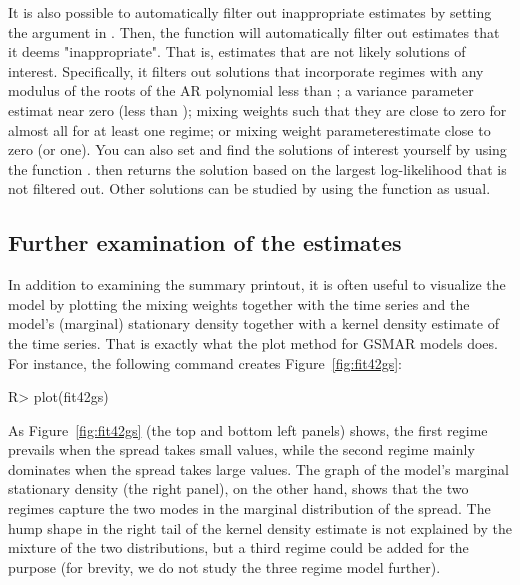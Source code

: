 \documentclass[nojss]{jss} %
\begin{document}
It is also possible to automatically filter out inappropriate estimates by setting the argument  in . Then, the function will automatically filter out estimates that it deems "inappropriate".  That is, estimates that are not likely solutions of interest. Specifically, it filters out solutions that incorporate regimes with any modulus of the roots of the AR polynomial less than ; a variance parameter estimat near zero  (less than ); mixing weights such that they are close to zero for almost all  for at least one regime; or mixing weight parameterestimate close to zero (or one). You can also set  and find the solutions of interest yourself by using the function .  then returns the solution based on the largest log-likelihood that is not filtered out. Other solutions can be studied by using the function  as usual.


\subsection{Further examination of the estimates}\label{sec:examestim}
In addition to examining the summary printout, it is often useful to visualize the model by plotting the mixing weights together with the time series and the model's (marginal) stationary density together with a kernel density estimate of the time series. That is exactly what the plot method for GSMAR models does. For instance, the following command creates Figure~\ref{fig:fit42gs}:
%
\begin{CodeChunk}
\begin{CodeInput}
R> plot(fit42gs)
\end{CodeInput}
\end{CodeChunk}
%
As Figure~\ref{fig:fit42gs} (the top and bottom left panels) shows, the first regime prevails when the spread takes small values, while the second regime mainly dominates when the spread takes large values. The graph of the model's marginal stationary density (the right panel), on the other hand, shows that the two regimes capture the two modes in the marginal distribution of the spread. The hump shape in the right tail of the kernel density estimate is not explained by the mixture of the two distributions, but a third regime could be added for the purpose (for brevity, we do not study the three regime model further).
\end{document}
